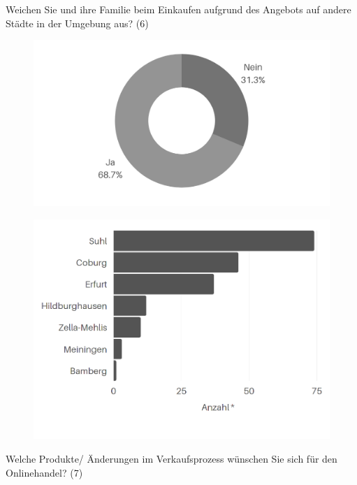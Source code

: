 \newpage\noindent Weichen Sie und ihre Familie beim Einkaufen aufgrund des Angebots auf andere Städte in der Umgebung aus? (6)\\
\vfill
\begin{figure}[H]
    \begin{center}
        \includegraphics[width=12cm]{media/schuelerumfrage/6.1.png}
    \end{center}
\end{figure}
\vfill
\begin{figure}[H]
    \begin{center}
        \includegraphics[width=12cm]{media/schuelerumfrage/6.2.png}
    \end{center}
\end{figure}
\vfill



\newpage\noindent Welche Produkte/ Änderungen im Verkaufsprozess wünschen Sie sich für den Onlinehandel? (7)\\\\

